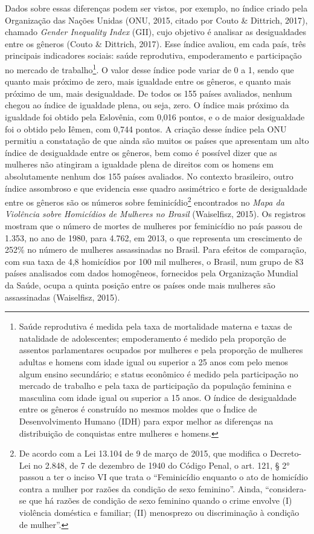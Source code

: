 Dados sobre essas diferenças podem ser vistos, por exemplo, no índice criado pela Organização das Nações Unidas (ONU, 2015, citado por Couto \& Dittrich, 2017), chamado \textit{Gender Inequality Index} (GII), cujo objetivo é analisar as desigualdades entre os gêneros (Couto \& Dittrich, 2017). Esse índice avaliou, em cada país, três principais indicadores sociais: saúde reprodutiva, empoderamento e participação no mercado de trabalho\footnote{Saúde reprodutiva é medida pela taxa de mortalidade materna e taxas de natalidade de adolescentes; empoderamento é medido pela proporção de assentos parlamentares ocupados por mulheres e pela proporção de mulheres adultas e homens com idade igual ou superior a 25 anos com pelo menos algum ensino secundário; e status econômico é medido pela participação no mercado de trabalho e pela taxa de participação da população feminina e masculina com idade igual ou superior a 15 anos. O índice de desigualdade entre os gêneros é construído no mesmos moldes que o Índice de Desenvolvimento Humano (IDH) para expor melhor as diferenças na distribuição de conquistas entre mulheres e homens.}. O valor desse índice pode variar de 0 a 1, sendo que quanto mais próximo de zero, mais igualdade entre os gêneros, e quanto mais próximo de um, mais desigualdade. De todos os 155 países avaliados, nenhum chegou ao índice de igualdade plena, ou seja, zero. O índice mais próximo da igualdade foi obtido pela Eslovênia, com 0,016 pontos, e o de maior desigualdade foi o obtido pelo Iêmen, com 0,744 pontos. A criação desse índice pela ONU permitiu a constatação de que ainda são muitos os países que apresentam um alto índice de desigualdade entre os gêneros, bem como é possível dizer que as mulheres não atingiram a igualdade plena de direitos com os homens em absolutamente nenhum dos 155 países avaliados. No contexto brasileiro, outro índice assombroso e que evidencia esse quadro assimétrico e forte de desigualdade entre os gêneros são os números sobre feminicídio\footnote{De acordo com a Lei 13.104 de 9 de março de 2015, que modifica o Decreto-Lei no 2.848, de 7 de dezembro de 1940 do Código Penal, o art. 121, § 2° passou a ter o inciso VI que trata o ``Feminicídio enquanto o ato de homicídio contra a mulher por razões da condição de sexo feminino''. Ainda, ``considera-se que há razões de condição de sexo feminino quando o crime envolve (I) violência doméstica e familiar; (II) menosprezo ou discriminação à condição de mulher''.}  encontrados no \textit{Mapa da Violência sobre Homicídios de Mulheres no Brasil} (Waiselfisz, 2015). Os registros mostram que o número de mortes de mulheres por feminicídio no país passou de 1.353, no ano de 1980, para 4.762, em 2013, o que representa um crescimento de 252\% no número de mulheres assassinadas no Brasil. Para efeitos de comparação, com sua taxa de 4,8 homicídios por 100 mil mulheres, o Brasil, num grupo de 83 países analisados com dados homogêneos, fornecidos pela Organização Mundial da Saúde, ocupa a quinta posição entre os países onde mais mulheres são assassinadas (Waiselfisz, 2015).

